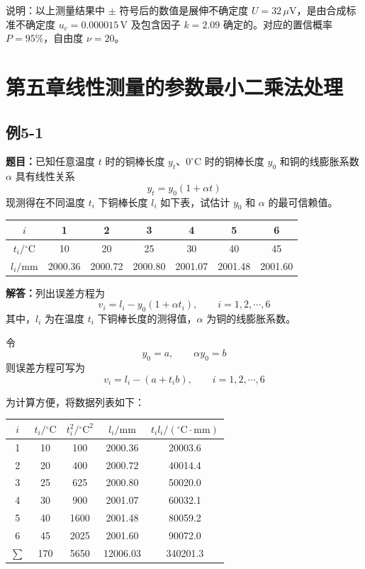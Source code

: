 \documentclass[UTF8,zihao=-4]{ctexart}
\newcommand{\problem}[1]{\subsection*{#1}}
\newcommand{\timu}{\noindent\textbf{题目：}}
\newcommand{\jieda}{\noindent\textbf{解答：}}
\begin{document}
说明：以上测量结果中 $\pm$ 符号后的数值是展伸不确定度 $U=32\,\mu\mathrm{V}$，是由合成标准不确定度 $u_c=0.000015\,\mathrm{V}$ 及包含因子 $k=2.09$ 确定的。对应的置信概率 $P=95\%$，自由度 $\nu=20$。


\section*{第五章\quad 线性测量的参数最小二乘法处理}

\problem{例5-1}

\timu 已知任意温度 $t$ 时的铜棒长度 $y_t$、$0^\circ\mathrm{C}$ 时的铜棒长度 $y_0$ 和铜的线膨胀系数 $\alpha$ 具有线性关系
\begin{equation*}
    y_t=y_0(1+\alpha t)
\end{equation*}
现测得在不同温度 $t_i$ 下铜棒长度 $l_i$ 如下表，试估计 $y_0$ 和 $\alpha$ 的最可信赖值。

\begin{center}
\small
\setlength{\tabcolsep}{5pt}
\begin{tabular}{c|cccccc}
\toprule
$i$ & 1 & 2 & 3 & 4 & 5 & 6\\
\midrule
$t_i/{}^\circ\mathrm{C}$ & 10 & 20 & 25 & 30 & 40 & 45\\
$l_i/\mathrm{mm}$ & 2000.36 & 2000.72 & 2000.80 & 2001.07 & 2001.48 & 2001.60\\
\bottomrule
\end{tabular}
\end{center}

\jieda 列出误差方程为
\begin{equation*}
    v_i=l_i-y_0(1+\alpha t_i),
    \qquad i=1,2,\cdots,6
\end{equation*}
其中，$l_i$ 为在温度 $t_i$ 下铜棒长度的测得值，$\alpha$ 为铜的线膨胀系数。

令
\begin{equation*}
    y_0=a,\qquad \alpha y_0=b
\end{equation*}
则误差方程可写为
\begin{equation*}
    v_i=l_i-(a+t_i b),
    \qquad i=1,2,\cdots,6
\end{equation*}

为计算方便，将数据列表如下：

\begin{center}
\small
\setlength{\tabcolsep}{5pt}
\begin{tabular}{c|c|c|c|c}
\toprule
$i$ & $t_i/{}^\circ\mathrm{C}$ & $t_i^2/{}^\circ\mathrm{C}^2$ & $l_i/\mathrm{mm}$ & $t_i l_i/({}^\circ\mathrm{C}\cdot\mathrm{mm})$\\
\midrule
1 & 10 & 100 & 2000.36 & 20003.6\\
2 & 20 & 400 & 2000.72 & 40014.4\\
3 & 25 & 625 & 2000.80 & 50020.0\\
4 & 30 & 900 & 2001.07 & 60032.1\\
5 & 40 & 1600 & 2001.48 & 80059.2\\
6 & 45 & 2025 & 2001.60 & 90072.0\\
\midrule
$\sum$ & 170 & 5650 & 12006.03 & 340201.3\\
\bottomrule
\end{tabular}
\end{center}
\end{document}
